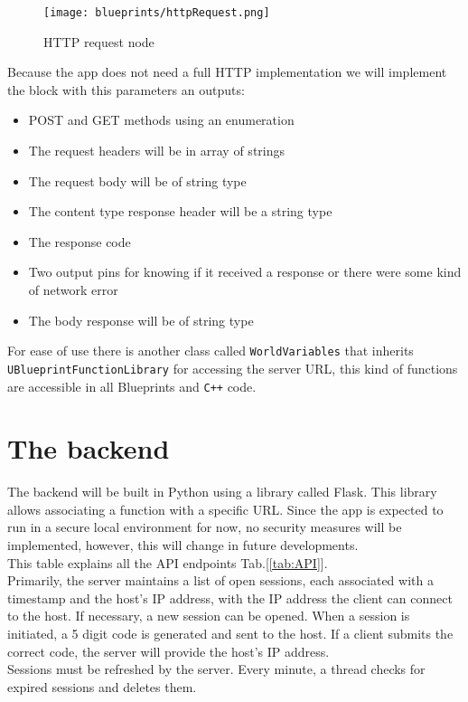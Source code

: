 \begin{figure}[ht]
    \centering
    \texttt{[image: blueprints/httpRequest.png]}
    \caption{HTTP request node}
    \label{fig:HTTPrequest}
\end{figure}
\noindent
Because the app does not need a full \ac{HTTP} implementation we will implement the block with this parameters an outputs:
\begin{itemize}
    \item POST and GET methods using an enumeration
    \item The request headers will be in array of strings
    \item The request body will be of string type
    \item The content type response header will be a string type
    \item The response code
    \item Two output pins for knowing if it received a response or there were some kind of network error
    \item The body response will be of string type
\end{itemize}
\noindent
For ease of use there is another class called \texttt{WorldVariables} that inherits \linebreak\texttt{UBlueprintFunctionLibrary} for accessing the server \ac{URL}, this kind of functions are accessible in all Blueprints and \texttt{C++} code.

\section{The backend}
\noindent
The backend will be built in Python using a library called Flask. This library allows associating a function with a specific \ac{URL}.
Since the app is expected to run in a secure local environment for now, no security measures will be implemented, however, this will change in future developments.\\
This table explains all the \ac{API} endpoints Tab.[\ref{tab:API}].\\
Primarily, the server maintains a list of open sessions, each associated with a timestamp and the host's \ac{IP} address, with the \ac{IP} address the client can connect to the host.
If necessary, a new session can be opened. When a session is initiated, a 5 digit code is generated and sent to the host.
If a client submits the correct code, the server will provide the host's IP address.\\
Sessions must be refreshed by the server. Every minute, a thread checks for expired sessions and deletes them.

